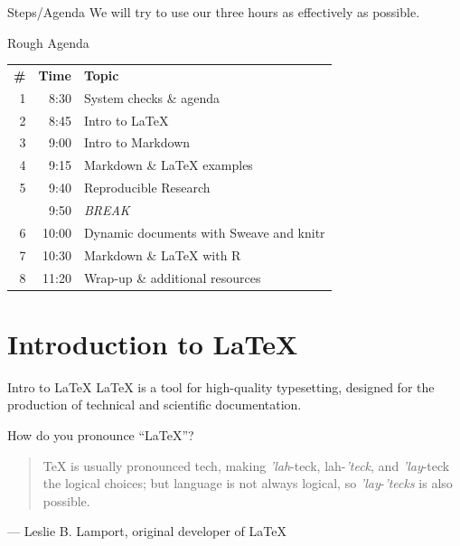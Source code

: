 \documentclass{beamer}
\begin{document}
\begin{frame}{Steps/Agenda}
\vfill
We will try to use our three hours as effectively as possible.
\begin{exampleblock}{Rough Agenda}
\begin{center}
\begin{tabular}{r|r|l}
    \textbf{\#} & \textbf{Time} & \textbf{Topic} \\
    1 & 8:30 & System checks \& agenda \\
    2 & 8:45 & Intro to LaTeX \\
    3 & 9:00 & Intro to Markdown \\
    4 & 9:15 & Markdown \& LaTeX examples \\
    5 & 9:40 & Reproducible Research \\
    \hline
     & 9:50 & \emph{BREAK} \\
    \hline
    6 & 10:00 & Dynamic documents with Sweave and knitr \\
    7 & 10:30 & Markdown \& LaTeX with R \\
    8 & 11:20 & Wrap-up \& additional resources
\end{tabular}
\end{center}
\end{exampleblock}
\end{frame}

\section{Introduction to LaTeX}
\begin{frame}{Intro to LaTeX}
\vfill
LaTeX is a tool for high-quality typesetting, designed for the production of technical and scientific documentation.
\vfill
\begin{block}{How do you pronounce ``LaTeX''?}
    \begin{quote}
        TeX is usually pronounced tech, making \emph{'lah}-teck, lah-\emph{'teck}, and \emph{'lay}-teck the logical choices; but language is not always logical, so \emph{'lay}-\emph{'tecks} is also possible.
    \end{quote}
    --- Leslie B. Lamport, original developer of \LaTeX{}
\end{block}
\end{frame}
\end{document}
